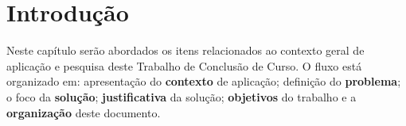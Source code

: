 \chapter{Introdução}
\label{chap:intro}

Neste capítulo serão abordados os itens relacionados ao contexto geral de
aplicação e pesquisa deste Trabalho de Conclusão de Curso. O fluxo está
organizado em: apresentação do \textbf{contexto} de aplicação; definição do
\textbf{problema}; o foco da \textbf{solução}; \textbf{justificativa} da solução; \textbf{objetivos}
do trabalho e a \textbf{organização} deste documento.




